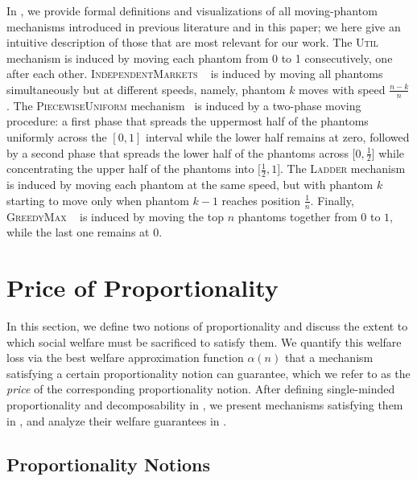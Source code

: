 \documentclass[11pt]{article}
\newcommand{\IM}{\textsc{IndependentMarkets} }
\newcommand{\Ladder}{\textsc{Ladder} }
\newcommand{\GreedyMax}{\textsc{GreedyMax} }
\newcommand{\PiecewiseUniform}{\textsc{PiecewiseUniform} }
\newcommand{\Ut}{\textsc{Util} }
\newcommand{\smp}{single-minded proportionality }
\newcommand{\dec}{decomposability }
\begin{document}
In , we provide formal definitions and visualizations of all moving-phantom mechanisms introduced in previous literature and in this paper; we here give an intuitive description of those that are most relevant for our work.
The \Ut mechanism \citep{freeman2021truthful} 
is induced by moving each phantom from 0 to 1 consecutively, one after each other.
\IM~\citep{freeman2021truthful} is 
induced by moving all phantoms simultaneously but at different speeds, namely, phantom $k$ moves with speed $\textstyle \frac{n-k}{n}$.
The \PiecewiseUniform mechanism~\citep{caragiannis2022truthful} is 
induced by
a two-phase moving procedure: a first phase that spreads the uppermost half of the phantoms uniformly across the $[0,1]$ interval while the lower half remains at zero, followed by a second phase that spreads the lower half of the phantoms across $\big[0, \frac{1}{2}\big]$ while concentrating the upper half of the phantoms into $\big[\frac{1}{2}, 1\big]$.
The \Ladder mechanism~\citep{freeman2024project} is 
induced by moving each phantom at the same speed, but with phantom $k$ starting to move only when phantom $k-1$ reaches position $\frac{1}{n}$.
Finally, \GreedyMax~\citep{berg2024truthful} is 
induced by moving the top $n$ phantoms together from $0$ to $1$, while the last one remains at $0$.

\section{Price of Proportionality} \label{sec:worst_case_price}


In this section, we define two notions of proportionality and discuss the extent to which social welfare must be sacrificed to satisfy them. We quantify this welfare loss via the best welfare approximation function $\alpha(n)$ that a mechanism satisfying a certain proportionality notion can guarantee, which we refer to as the \textit{price} of the corresponding proportionality notion. %
After defining \smp and \dec in , we present mechanisms satisfying them in , and analyze their welfare guarantees in . 

\subsection{Proportionality Notions}\label{subsec:prop-notions}
\end{document}
